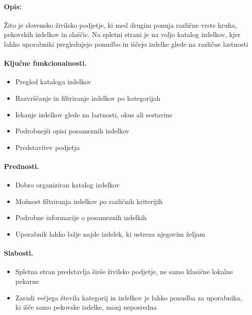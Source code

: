 \documentclass[a4paper,12pt]{article}
\begin{document}
\paragraph{Opis:}
Žito je slovensko živilsko podjetje, ki med drugim ponuja različne vrste kruha, pekovskih izdelkov in slaščic. Na spletni strani je na voljo katalog izdelkov, kjer lahko uporabniki pregledujejo ponudbo in iščejo izdelke glede na različne lastnosti

\paragraph{Ključne funkcionalnosti.}
\begin{itemize}
  \item Pregled kataloga izdelkov
  \item Razvrščanje in filtriranje izdelkov po kategorijah
  \item Iskanje izdelkov glede na lastnosti, okus ali sestavine
  \item Podrobnejši opisi posameznih izdelkov
  \item Predstavitev podjetja
\end{itemize}

\paragraph{Prednosti.}
\begin{itemize}
  \item Dobro organiziran katalog izdelkov
  \item Možnost filtriranja izdelkov po različnih kriterijih
  \item Podrobne informacije o posameznih izdelkih
  \item Uporabnik lahko lažje najde izdelek, ki ustreza njegovim željam
\end{itemize}

\paragraph{Slabosti.}
\begin{itemize}
  \item Spletna stran predstavlja širše živilsko podjetje, ne samo klasične lokalne pekarne
  \item Zaradi večjega števila kategorij in izdelkov je lahko ponudba za uporabnika, ki išče samo pekovske izdelke, manj neposredna
\end{itemize}
\end{document}
